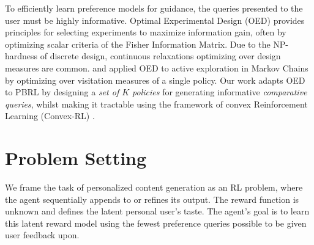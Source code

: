\documentclass{article}
\begin{document}
To efficiently learn preference models for guidance, the queries presented to the user must be highly informative. Optimal Experimental Design (OED) \cite{doi:10.1137/1.9780898719109, fedorov1997model} provides principles for selecting experiments to maximize information gain, often by optimizing scalar criteria of the Fisher Information Matrix. Due to the NP-hardness of discrete design, continuous relaxations optimizing over design measures are common. \citet{pmlr-v206-mutny23a, wagenmaker2023instancedependentnearoptimalpolicyidentification} and \citet{folch2024transitionconstrainedbayesianoptimization} applied OED to active exploration in Markov Chains by optimizing over visitation measures of a single policy. Our work adapts OED to PBRL by designing a \emph{set of $K$ policies} for generating informative \emph{comparative queries}, whilst making it tractable using the framework of convex Reinforcement Learning (Convex-RL) \cite{hazan2019provably, DBLP:journals/corr/abs-2106-00661}.


\vspace{-0.2cm}\section{Problem Setting}
\label{sec:problem_setting}
\vspace{-0.2cm} We frame the task of personalized content generation as an RL problem, where the agent sequentially appends to or refines its output. The reward function is unknown and defines the latent personal user's taste. The agent's goal is to learn this latent reward model using the fewest preference queries possible to be given user feedback upon.
\end{document}
